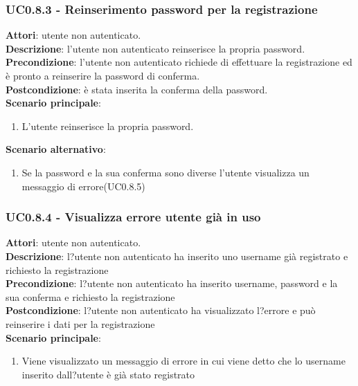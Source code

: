 	\subsubsection{UC0.8.3 - Reinserimento password per la registrazione} {
		\label{uc0.8.3}
		\textbf{Attori}: utente non autenticato. \\
		\textbf{Descrizione}: l'utente non autenticato reinserisce la propria password.	\\
		\textbf{Precondizione}: l'utente non autenticato richiede di effettuare la registrazione ed è pronto a reinserire la password di conferma.	\\
		\textbf{Postcondizione}: è stata inserita la conferma della password.\\
		\textbf{Scenario principale}:
		\begin{enumerate}
			\item L'utente reinserisce la propria password.
		\end{enumerate}
		}
		\textbf{Scenario alternativo}:
		\begin{enumerate}
			\item Se la password e la sua conferma sono diverse l'utente visualizza un messaggio di errore(UC0.8.5)
		\end{enumerate}
	\subsubsection{UC0.8.4 - Visualizza errore utente già in uso} {
		\label{uc0.8.4}
		\textbf{Attori}: utente non autenticato. \\
		\textbf{Descrizione}: l?utente non autenticato ha inserito uno username già registrato e richiesto la registrazione	\\
		\textbf{Precondizione}:  l?utente non autenticato ha inserito username, password e la sua conferma e richiesto la registrazione	\\
		\textbf{Postcondizione}: l?utente non autenticato ha visualizzato l?errore e può reinserire i dati per la registrazione  \\
		\textbf{Scenario principale}:
		\begin{enumerate}
			\item Viene visualizzato un messaggio di errore in cui viene detto che  lo username inserito dall?utente è già stato registrato
		\end{enumerate}
		}
